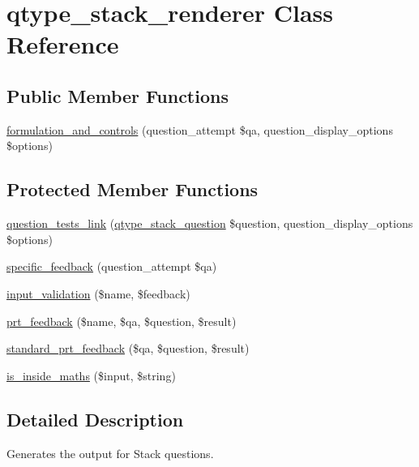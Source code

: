 \hypertarget{classqtype__stack__renderer}{
\section{qtype\_\-stack\_\-renderer Class Reference}
\label{classqtype__stack__renderer}
}
\subsection*{Public Member Functions}
\begin{DoxyCompactItemize}
\item 
\hyperlink{classqtype__stack__renderer_ac8c6fd80afd18d2cd45eecaef608eee1}{formulation\_\-and\_\-controls} (question\_\-attempt \$qa, question\_\-display\_\-options \$options)
\end{DoxyCompactItemize}
\subsection*{Protected Member Functions}
\begin{DoxyCompactItemize}
\item 
\hyperlink{classqtype__stack__renderer_a44386769fb98173ad4052eafd424fe07}{question\_\-tests\_\-link} (\hyperlink{classqtype__stack__question}{qtype\_\-stack\_\-question} \$question, question\_\-display\_\-options \$options)
\item 
\hyperlink{classqtype__stack__renderer_a4125328bed788238256940894f9053c3}{specific\_\-feedback} (question\_\-attempt \$qa)
\item 
\hyperlink{classqtype__stack__renderer_a45cc18a3803bc47ef05c95c21d2c08e9}{input\_\-validation} (\$name, \$feedback)
\item 
\hyperlink{classqtype__stack__renderer_a7dd45346f726c3dc68c98c8b3d58dc14}{prt\_\-feedback} (\$name, \$qa, \$question, \$result)
\item 
\hyperlink{classqtype__stack__renderer_ad70697193990cc2e7282c260d8c3f375}{standard\_\-prt\_\-feedback} (\$qa, \$question, \$result)
\item 
\hyperlink{classqtype__stack__renderer_a208556850d5c0d037268a9c35d7480ac}{is\_\-inside\_\-maths} (\$input, \$string)
\end{DoxyCompactItemize}


\subsection{Detailed Description}
Generates the output for Stack questions.

